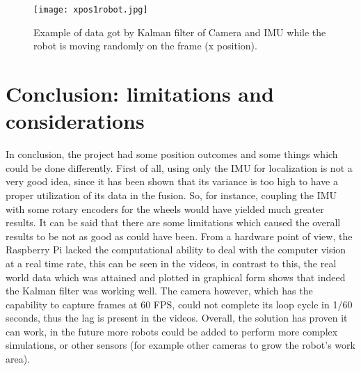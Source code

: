 \documentclass[11pt,twocolumn]{article}
\begin{document}
\begin{figure}[ht!]
\centering
\texttt{[image: xpos1robot.jpg]}
\caption{Example of data got by Kalman filter of Camera and IMU while the robot is moving randomly on the frame (x position).}
\label{xpos1robot.jpg}
\end{figure}

\section{Conclusion: limitations and considerations}
In conclusion, the project had some position outcomes and some things which could be done differently. First of all, using only the IMU for localization is not a very good idea, since it has been shown that its variance is too high to have a proper utilization of its data in the fusion. So, for instance, coupling the IMU with some rotary encoders for the wheels would have yielded much greater results.\newline
It can be said that there are some limitations which caused the overall results to be not as good as could have been. From a hardware point of view, the Raspberry Pi lacked the computational ability to deal with the computer vision at a real time rate, this can be seen in the videos, in contrast to this, the real world data which was attained and plotted in graphical form shows that indeed the Kalman filter was working well. The camera however, which has the capability to capture frames at 60 FPS, could not complete its loop cycle in 1/60 seconds, thus the lag is present in the videos.\newline
Overall, the solution has proven it can work, in the future more robots could be added to perform more complex simulations, or other sensors (for example other cameras to grow the robot's work area). 



\end{document}
